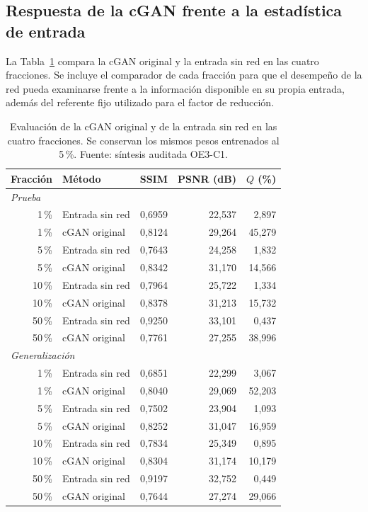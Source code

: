 \subsection{Respuesta de la cGAN frente a la estadística de entrada}
La Tabla~\ref{tab:res-multifraccion} compara la cGAN original y la entrada sin red en las cuatro fracciones. Se incluye el comparador de cada fracción para que el desempeño de la red pueda examinarse frente a la información disponible en su propia entrada, además del referente fijo utilizado para el factor de reducción.
\begin{table}[htbp]\centering\small
\caption[cGAN y entrada sin red en cuatro fracciones]{Evaluación de la cGAN original y de la entrada sin red en las cuatro fracciones. Se conservan los mismos pesos entrenados al 5\,\%. Fuente: síntesis auditada OE3-C1.}\label{tab:res-multifraccion}
\begin{tabular}{@{}rlrrr@{}}\toprule
Fracción & Método & SSIM & PSNR (dB) & $Q$ (\%)\\\midrule
\multicolumn{5}{l}{\textit{Prueba}}\\
1\,\% & Entrada sin red & 0{,}6959 & 22{,}537 & 2{,}897\\
1\,\% & cGAN original & 0{,}8124 & 29{,}264 & 45{,}279\\
5\,\% & Entrada sin red & 0{,}7643 & 24{,}258 & 1{,}832\\
5\,\% & cGAN original & 0{,}8342 & 31{,}170 & 14{,}566\\
10\,\% & Entrada sin red & 0{,}7964 & 25{,}722 & 1{,}334\\
10\,\% & cGAN original & 0{,}8378 & 31{,}213 & 15{,}732\\
50\,\% & Entrada sin red & 0{,}9250 & 33{,}101 & 0{,}437\\
50\,\% & cGAN original & 0{,}7761 & 27{,}255 & 38{,}996\\
\midrule
\multicolumn{5}{l}{\textit{Generalización}}\\
1\,\% & Entrada sin red & 0{,}6851 & 22{,}299 & 3{,}067\\
1\,\% & cGAN original & 0{,}8040 & 29{,}069 & 52{,}203\\
5\,\% & Entrada sin red & 0{,}7502 & 23{,}904 & 1{,}093\\
5\,\% & cGAN original & 0{,}8252 & 31{,}047 & 16{,}959\\
10\,\% & Entrada sin red & 0{,}7834 & 25{,}349 & 0{,}895\\
10\,\% & cGAN original & 0{,}8304 & 31{,}174 & 10{,}179\\
50\,\% & Entrada sin red & 0{,}9197 & 32{,}752 & 0{,}449\\
50\,\% & cGAN original & 0{,}7644 & 27{,}274 & 29{,}066\\
\bottomrule\end{tabular}\end{table}

